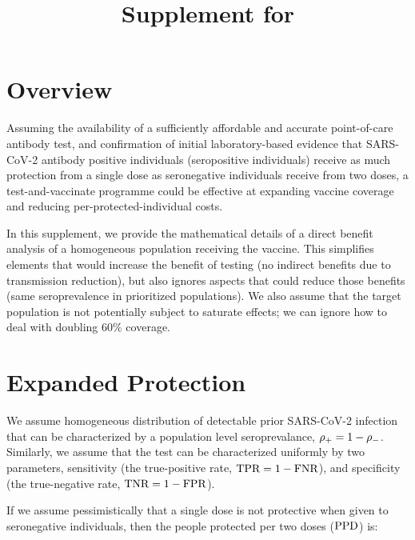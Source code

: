 \documentclass{article}
\begin{document}


\title{Supplement for \partitle}

\maketitle




\section{Overview}

Assuming the availability of a sufficiently affordable and accurate point-of-care antibody test, and confirmation of initial laboratory-based evidence that SARS-CoV-2 antibody positive individuals (\ie* seropositive individuals) receive as much protection from a single dose as seronegative individuals receive from two doses, a test-and-vaccinate programme could be effective at expanding vaccine coverage and reducing per-protected-individual costs.

In this supplement, we provide the mathematical details of a direct benefit analysis of a homogeneous population receiving the vaccine. This simplifies elements that would increase the benefit of testing (\eg* no indirect benefits due to transmission reduction), but also ignores aspects that could reduce those benefits (\eg* same seroprevalence in prioritized populations). We also assume that the target population is not potentially subject to saturate effects; \eg* we can ignore how to deal with doubling 60\% coverage.

\section{Expanded Protection}

We assume homogeneous distribution of detectable prior SARS-CoV-2 infection that can be characterized by a population level seroprevalance, $\rho_{{+}} = 1 - \rho_{{-}}$. Similarly, we assume that the test can be characterized uniformly by two parameters, sensitivity (the true-positive rate, $\textrm{TPR} = 1 - \textrm{FNR}$), and specificity (the true-negative rate, $\textrm{TNR} = 1 - \textrm{FPR}$).

If we assume pessimistically that a single dose is not protective when given to seronegative individuals, then the people protected per two doses ($\textrm{PPD}$) is:
\end{document}
